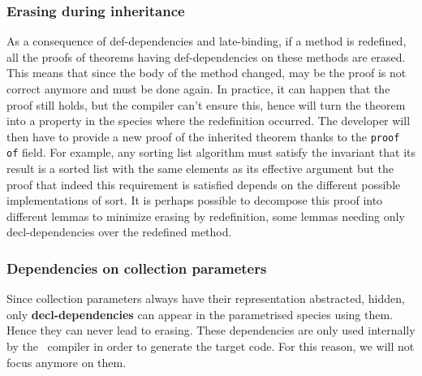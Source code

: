 \subsubsection{Erasing during inheritance}
\label{erasing}
As a consequence of def-dependencies and late-binding, if a method is
redefined, all the proofs of theorems having def-dependencies on these
methods are erased. This means that since the body of the method
changed, may be the proof is not correct anymore and must be done
again. In practice, it can happen that the proof still holds, but the
compiler can't ensure this, hence will turn the theorem into a
property in the species where the redefinition occurred. The developer
will then have to provide a new proof of the inherited theorem thanks
to the {\tt proof of} field. For example, any sorting list algorithm
must satisfy the invariant that its result is a sorted list with the
same elements as its effective argument  but the
proof that indeed this requirement is satisfied depends on the
different possible implementations of sort. It is perhaps possible to
decompose this proof into different lemmas to minimize erasing by
redefinition, some lemmas needing only decl-dependencies over the
redefined method. 



\subsubsection{Dependencies on collection parameters}
Since collection parameters always have their representation abstracted,
hidden, only {\bf decl-dependencies} can appear in the parametrised
species using them. Hence they can never lead to erasing. These
dependencies are only used internally by the \focal\ compiler in order
to generate the target code. For this reason, we will not focus anymore
on them.
